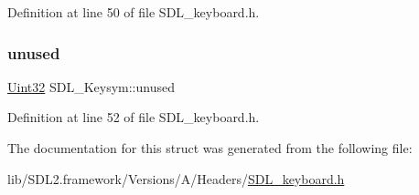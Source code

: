 Definition at line 50 of file S\+D\+L\+\_\+keyboard.\+h.

\mbox{\label{struct_s_d_l___keysym_ab1d0a50cc619966fb06b92e15cc46dd9}} 
\subsubsection{\texorpdfstring{unused}{unused}}
{\footnotesize\ttfamily \mbox{\hyperlink{_s_d_l__stdinc_8h_add440eff171ea5f55cb00c4a9ab8672d}{Uint32}} S\+D\+L\+\_\+\+Keysym\+::unused}



Definition at line 52 of file S\+D\+L\+\_\+keyboard.\+h.



The documentation for this struct was generated from the following file\+:\begin{DoxyCompactItemize}
\item 
lib/\+S\+D\+L2.\+framework/\+Versions/\+A/\+Headers/\mbox{\hyperlink{_s_d_l__keyboard_8h}{S\+D\+L\+\_\+keyboard.\+h}}\end{DoxyCompactItemize}
